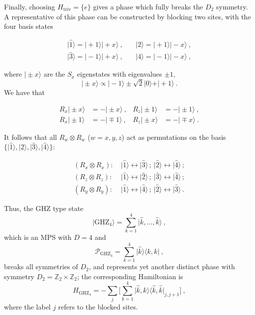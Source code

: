 \documentclass[twocolumn,superscriptaddress,prb,linenumbers]{revtex4-1}
\newcommand{\ket}[1]{\vert#1\rangle}
\newcommand{\bra}[1]{\langle#1\vert}
\newcommand{\mc}[1]{\mathcal{#1}}
\begin{document}
Finally, choosing $H_\mathrm{triv}=\{e\}$ gives a phase which fully breaks
the $D_2$ symmetry. A representative of this phase can be constructed by
blocking two sites, with the four basis states
\begin{linenomath}
    \begin{align*}
        \ket{\hat 1} = \ket{+1}\ket{+x}\ ,
        \quad & \ket{\hat 2} = \ket{+1}\ket{-x}\ , \\
        \ket{\hat 3} = \ket{-1}\ket{+x}\ ,
        \quad & \ket{\hat 4} = \ket{-1}\ket{-x}\ ,
    \end{align*}
\end{linenomath}
where $\ket{\pm x}$ are the $S_x$ eigenstates with eigenvalues $\pm 1$,
\[
    \ket{\pm x} \propto \ket{-1} \pm \sqrt{2}\ket{0} + \ket{+1}\ .
\]
We have that
\begin{linenomath}
    \begin{align*}
        R_x\ket{\pm x} & = -\ket{\pm x}\ , & R_z\ket{\pm 1} & = -\ket{\pm 1}\ , \\
        R_x\ket{\pm 1} & = -\ket{\mp 1}\ , & R_z\ket{\pm x} & = -\ket{\mp x}\ .
    \end{align*}
\end{linenomath}
It follows that all $R_w\otimes R_w$ ($w=x,y,z$) act as permutations on
the basis $\{\ket{\hat 1},\ket{\hat 2},\ket{\hat 3},\ket{\hat 4}\}$:
\begin{linenomath}
    \begin{align*}
        (R_x\otimes R_x):\  & \ket{\hat 1}\leftrightarrow \ket{\hat 3}\,; \
        \ket{\hat 2}\leftrightarrow \ket{\hat 4}\,;                         \\
        (R_z\otimes R_z):\  & \ket{\hat 1}\leftrightarrow \ket{\hat 2}\,; \
        \ket{\hat 3}\leftrightarrow \ket{\hat 4}\,;                         \\
        (R_y\otimes R_y):\  & \ket{\hat 1}\leftrightarrow \ket{\hat 4}\,; \
        \ket{\hat 2}\leftrightarrow \ket{\hat 3}\,.
    \end{align*}
\end{linenomath}
Thus, the GHZ type state
\[
    \ket{\mathrm{GHZ}_4} = \sum_{k=1}^{4} \ket{\hat k,\dots, \hat k}\ ,
\]
which is an MPS with $D=4$ and
\[
    \mc P_{\mathrm{GHZ}_4} = \sum_{k=1}^4\ket{\hat k}\bra{k,k}\ ,
\]
breaks all symmetries of $D_2$, and represents yet another distinct phase
with symmetry $D_2=\mathbb Z_2\times \mathbb Z_2$; the corresponding
Hamiltonian is
\[
    H_{\mathrm{GHZ}_4} =
    -\sum_j \Big[\sum_{k=1}^{4} \ket{\hat k,\hat k}\bra{\hat k,\hat k}_{j,j+1}\Big]\ ,
\]
where the label $j$ refers to the blocked sites.
\end{document}
